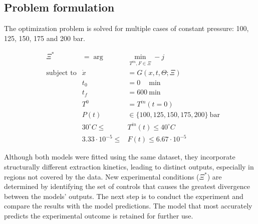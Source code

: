\documentclass[../Article_Design_of_Experiment.tex]{subfiles}
\begin{document}
	\subsection{Problem formulation}
	The optimization problem is solved for multiple cases of constant pressure: 100, 125, 150, 175 and 200 bar.
	
	{\footnotesize
		\begin{equation}
			\begin{aligned} 
				&\Xi^* &= \arg &\min_{ T^{in}, F \in \Xi} -j  \\
				&\text{subject to}
				& \dot{x} &= G(x,t,\Theta;\Xi) \\
				&& t_0&=0\quad~\text{min} \\
				&& t_f&=600~\text{min} \\
				&& T^{0} &= T^{in}(t=0) \\
				&& P(t) & \in \{100, 125, 150, 175, 200\}~\text{bar} \\
				&& 30^\circ C \leq &T^{in}(t) \leq 40^\circ C \\
				&& 3.33 \cdot 10^{-5} \leq &F(t) \leq 6.67 \cdot 10^{-5}
			\end{aligned} \label{EQ:Formulation}
	\end{equation} }
	
	Although both models were fitted using the same dataset, they incorporate structurally different extraction kinetics, leading to distinct outputs, especially in regions not covered by the data. New experimental conditions ($\Xi^*$) are determined by identifying the set of controls that causes the greatest divergence between the models’ outputs. The next step is to conduct the experiment and compare the results with the model predictions. The model that most accurately predicts the experimental outcome is retained for further use. 
	
\end{document}

